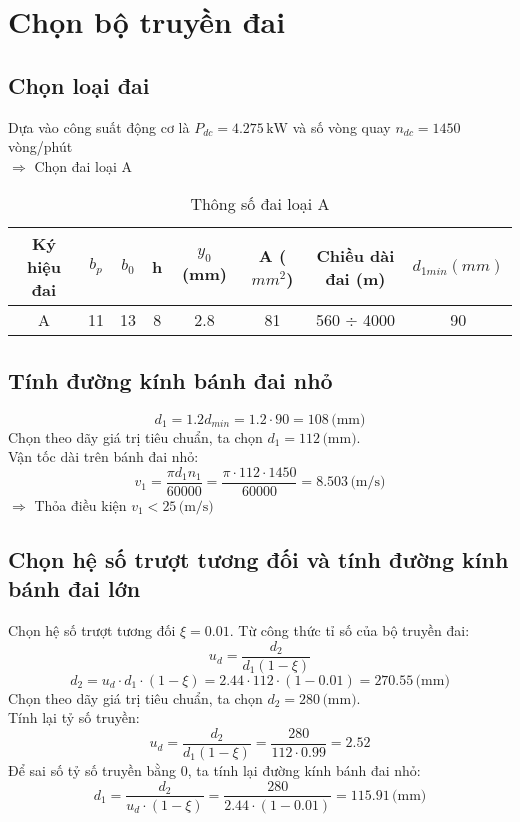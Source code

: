 \chapter{Chọn bộ truyền đai}
\section{Chọn loại đai}
Dựa vào công suất động cơ là $P_{dc} = 4.275 \, \text{kW}$ và số vòng quay $n_{dc} = 1450$ vòng/phút \\
$\Rightarrow$ Chọn đai loại A \\    
\begin{table}[H]
\begin{tabular}{|c|c|c|c|c|c|c|c|}
    \hline 
    Ký hiệu đai & $b_p$  & $b_0$  & h  & $y_0$ (mm) & A ($mm^2$) & Chiều dài đai (m) & $d_{1min} (mm)$ \\ \hline
    A & 11 & 13 & 8 & 2.8 & 81 & 560 $\div$ 4000 & 90 \\ \hline
\end{tabular}
\caption{Thông số đai loại A}
\end{table}
\section{Tính đường kính bánh đai nhỏ}
\begin{equation}
    d_1 = 1.2d_{min} = 1.2 \cdot 90 = 108 \, \text{(mm)}
\end{equation}
Chọn theo dãy giá trị tiêu chuẩn, ta chọn $d_1 = 112 \, \text{(mm)}$.\\
Vận tốc dài trên bánh đai nhỏ:
\begin{equation}
    v_1 = \frac{\pi d_1 n_1}{60000} = \frac{\pi \cdot 112 \cdot 1450}{60000} = 8.503 \, \text{(m/s)}
\end{equation}
$\Rightarrow$ Thỏa điều kiện $v_1 < 25 \, \text{(m/s)}$ \\

\section{Chọn hệ số trượt tương đối và tính đường kính bánh đai lớn}
Chọn hệ số trượt tương đối $\xi = 0.01$. Từ công thức tỉ số của bộ truyền đai:
\begin{equation}
    u_d = \frac{d_2}{d_1 (1 - \xi)}
\end{equation}
\begin{equation}
    d_2 = u_d \cdot d_1 \cdot (1 - \xi) = 2.44 \cdot 112 \cdot (1 - 0.01) = 270.55 \, \text{(mm)}
\end{equation}
Chọn theo dãy giá trị tiêu chuẩn, ta chọn $d_2 = 280 \, \text{(mm)}$.\\
Tính lại tỷ số truyền:
\begin{equation}
    u_d = \frac{d_2}{d_1 (1 - \xi)} = \frac{280}{112 \cdot 0.99} = 2.52
\end{equation}
Để sai số tỷ số truyền bằng 0, ta tính lại đường kính bánh đai nhỏ:
\begin{equation}
    d_1 = \frac{d_2}{u_d \cdot (1 - \xi)} = \frac{280}{2.44 \cdot (1 - 0.01)} = 115.91 \, \text{(mm)}
\end{equation}

